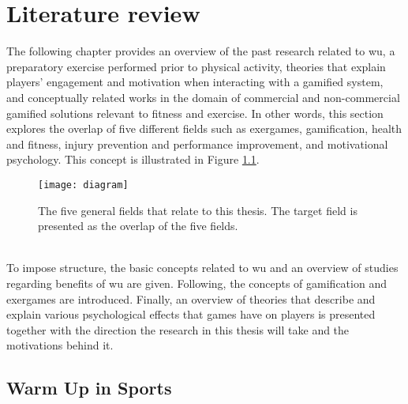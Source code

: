 \chapter{Literature review}\label{chapter:relatedwork}
The following chapter provides an overview of the past research related to \acrfull{wu}, a preparatory exercise performed prior to physical activity, theories that explain players' engagement and motivation when interacting with a gamified system, and conceptually related works in the domain of commercial and non-commercial gamified solutions relevant to fitness and exercise. In other words, this section explores the overlap of five different fields such as exergames, gamification, health and fitness, injury prevention and performance improvement, and motivational psychology. This concept is illustrated in Figure \ref{fig:diagram}.
\begin{figure}[h]
    \centering
    \texttt{[image: diagram]}
    \caption{The five general fields that relate to this thesis. The target field is presented as the overlap of the five fields.}
    \label{fig:diagram}
\end{figure}\\
To impose structure, the basic concepts related to \acrshort{wu} and an overview of studies regarding benefits of \acrshort{wu} are given. Following, the concepts of gamification and exergames are introduced. Finally, an overview of theories that describe and explain various psychological effects that games have on players is presented together with the direction the research in this thesis will take and the motivations behind it.
\section{Warm Up in Sports}
